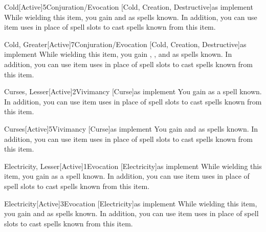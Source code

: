         \begin{magicitemdef}{Cold}[Active]{5}{Conjuration/Evocation [Cold, Creation, Destructive]}{as implement}
             While wielding this item, you gain  and  as spells known.
            In addition, you can use item uses in place of spell slots to cast spells known from this item.
        \end{magicitemdef}

        \begin{magicitemdef}{Cold, Greater}[Active]{7}{Conjuration/Evocation [Cold, Creation, Destructive]}{as implement}
             While wielding this item, you gain , , and  as spells known.
            In addition, you can use item uses in place of spell slots to cast spells known from this item.
        \end{magicitemdef}

        \begin{magicitemdef}{Curses, Lesser}[Active]{2}{Vivimancy [Curse]}{as implement}
             You gain  as a spell known.
            In addition, you can use item uses in place of spell slots to cast spells known from this item.
        \end{magicitemdef}

        \begin{magicitemdef}{Curses}[Active]{5}{Vivimancy [Curse]}{as implement}
             You gain  and  as spells known.
            In addition, you can use item uses in place of spell slots to cast spells known from this item.
        \end{magicitemdef}

        \begin{magicitemdef}{Electricity, Lesser}[Active]{1}{Evocation [Electricity]}{as implement}
             While wielding this item, you gain  as a spell known.
            In addition, you can use item uses in place of spell slots to cast spells known from this item.
        \end{magicitemdef}

        \begin{magicitemdef}{Electricity}[Active]{3}{Evocation [Electricity]}{as implement}
             While wielding this item, you gain  and  as spells known.
            In addition, you can use item uses in place of spell slots to cast spells known from this item.
        \end{magicitemdef}

